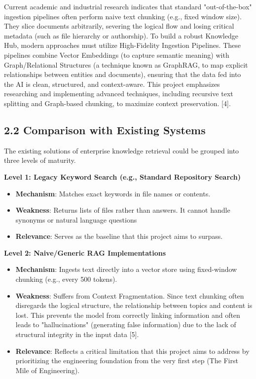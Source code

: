 \documentclass[12pt]{article}
\begin{document}
Current academic and industrial research indicates that standard
"out-of-the-box" ingestion pipelines often perform naive text chunking
(e.g., fixed window size). They slice documents arbitrarily, severing
the logical flow and losing critical metadata (such as file hierarchy or
authorship). To build a robust Knowledge Hub, modern approaches must
utilize High-Fidelity Ingestion Pipelines. These pipelines combine
Vector Embeddings (to capture semantic meaning) with Graph/Relational
Structures (a technique known as GraphRAG, to map explicit relationships
between entities and documents), ensuring that the data fed into the AI
is clean, structured, and context-aware. This project emphasizes
researching and implementing advanced techniques, including recursive
text splitting and Graph-based chunking, to maximize context
preservation. {[}4{]}.

\subsection{2.2 Comparison with Existing
Systems}\label{comparison-with-existing-systems}

The existing solutions of enterprise knowledge retrieval could be
grouped into three levels of maturity.

\textbf{Level 1: Legacy Keyword Search (e.g., Standard Repository
Search)}

\begin{itemize}
\item
  \textbf{Mechanism}: Matches exact keywords in file names or contents.
\item
  \textbf{Weakness}: Returns lists of files rather than answers. It
  cannot handle synonyms or natural language questions
\item
  \textbf{Relevance}: Serves as the baseline that this project aims to
  surpass.
\end{itemize}

\textbf{Level 2: Naive/Generic RAG Implementations}

\begin{itemize}
\item
  \textbf{Mechanism}: Ingests text directly into a vector store using
  fixed-window chunking (e.g., every 500 tokens).
\item
  \textbf{Weakness}: Suffers from Context Fragmentation. Since text
  chunking often disregards the logical structure, the relationship
  between topics and content is lost. This prevents the model from
  correctly linking information and often leads to "hallucinations"
  (generating false information) due to the lack of structural integrity
  in the input data {[}5{]}.
\item
  \textbf{Relevance}: Reflects a critical limitation that this project
  aims to address by prioritizing the engineering foundation from the
  very first step (The First Mile of Engineering).
\end{itemize}
\end{document}
